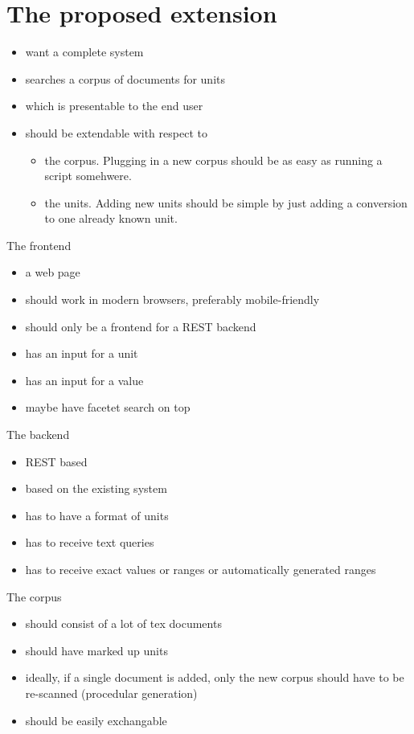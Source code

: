\documentclass[11pt]{article}
\begin{document}

\section{The proposed extension}
\label{sec:extension}


\begin{itemize}
  \item want a complete system
  \item searches a corpus of documents for units
  \item which is presentable to the end user
  \item should be extendable with respect to
  \begin{itemize}
    \item the corpus. Plugging in a new corpus should be as easy as running a script somehwere.
    \item the units. Adding new units should be simple by just adding a conversion to one already known unit.
  \end{itemize}
\end{itemize}

The frontend
\begin{itemize}
  \item a web page
  \item should work in modern browsers, preferably mobile-friendly
  \item should only be a frontend for a REST backend
  \item has an input for a unit
  \item has an input for a value
  \item maybe have facetet search on top
\end{itemize}

The backend
\begin{itemize}
  \item REST based
  \item based on the existing system
  \item has to have a format of units
  \item has to receive text queries
  \item has to receive exact values or ranges or automatically generated ranges
\end{itemize}

The corpus
\begin{itemize}
  \item should consist of a lot of tex documents
  \item should have marked up units
  \item ideally, if a single document is added, only the new corpus should have to be re-scanned (procedular generation)
  \item should be easily exchangable
\end{itemize}
\end{document}
